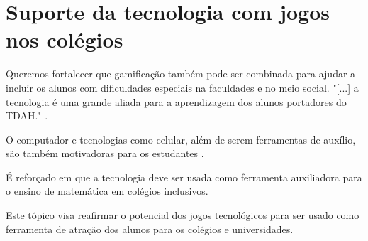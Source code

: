\begin{comment}
Foram anotadas algumas observações sobre os experimentos realizados em estudantes com TDAH para ser lembrado de incluir nos requisitos do jogo para aumentar o público alvo. A seguir alguns itens: 

Crianças com TDAH precisam de um feedback mais frequente. O feedback deve ser apresentado no momento do comportamento visado. Porém o próprio feedback pode causar uma distração, então ele deve ser feito seguido de uma chamada de atenção que redirecione o aluno para a próxima tarefa a ser cumprida (George J. DuPaul, PhD e Gary Stoner, PhD. p. 131-132).

O nível de complexidade das equações e das dificuldades aumentará gradativamente. Para pessoas com TDAH a facilidade em jogar é maior quando inicia-se com instruções iniciais simples e com pouco número de etapas. Para fixar melhor o entendimento do aluno sobre a atividade pede-se que a pessoa repita o que foi pedido como objetivo para completar a atividade. Ao existirem erros em atividade é bom variar as atividades para evitar o cansaço por repetição (George J. DuPaul, PhD e Gary Stoner, PhD. p.132).

Recompensas devem ser dadas para que a motivação aumente. Porém a pessoa deve escolher o prêmio desejado ao invés de ser entregue um prêmio que ela não deseje. Para isso antes da atividade é necessário a fase de negociação para que seja escolhidos possíveis prêmios que sirvam como motivação (George J. DuPaul, PhD e Gary Stoner, PhD. p.133).

\end{comment}


\section[Suporte da tecnologia com jogos nos colégios]{Suporte da tecnologia com jogos nos colégios}
Queremos fortalecer que gamificação também pode ser combinada para ajudar a incluir os alunos com dificuldades especiais na faculdades e no meio social. "[...] a tecnologia é uma grande aliada para a aprendizagem dos alunos portadores do TDAH."  \cite{matEtdah1}.

O computador e tecnologias como celular, além de serem ferramentas de auxílio, são também  motivadoras para os estudantes \cite{softwaregamificado}.

É reforçado em \cite{revbibmatgam} que a tecnologia deve ser usada como ferramenta auxiliadora para o ensino de matemática em colégios inclusivos.

Este tópico visa reafirmar o potencial dos jogos tecnológicos para ser usado como ferramenta de atração dos alunos para os colégios e universidades.